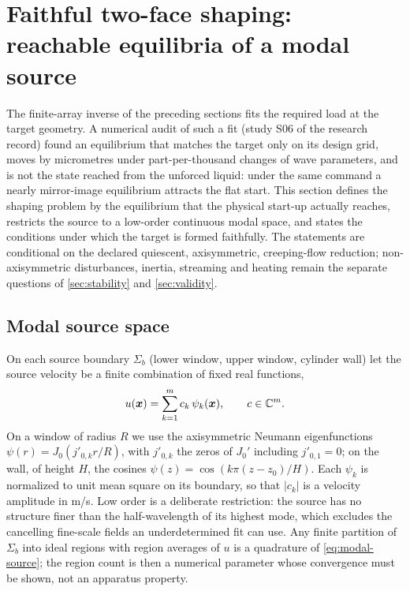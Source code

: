 \section{Faithful two-face shaping: reachable equilibria of a modal source}\label{sec:faithful}

The finite-array inverse of the preceding sections fits the required load at
the target geometry. A numerical audit of such a fit (study S06 of the
research record) found an equilibrium that matches the target only on its
design grid, moves by micrometres under part-per-thousand changes of wave
parameters, and is not the state reached from the unforced liquid: under the
same command a nearly mirror-image equilibrium attracts the flat start. This
section defines the shaping problem by the equilibrium that the physical
start-up actually reaches, restricts the source to a low-order continuous
modal space, and states the conditions under which the target is formed
faithfully. The statements are conditional on the declared quiescent,
axisymmetric, creeping-flow reduction; non-axisymmetric disturbances, inertia,
streaming and heating remain the separate questions of \cref{sec:stability}
and \cref{sec:validity}.

\subsection{Modal source space}
On each source boundary $\Sigma_b$ (lower window, upper window, cylinder wall)
let the source velocity be a finite combination of fixed real functions,
\begin{equation}
 u(\bm x)=\sum_{k=1}^{m}c_k\,\psi_k(\bm x),\qquad c\in\mathbb C^m .
 \label{eq:modal-source}
\end{equation}
On a window of radius $R$ we use the axisymmetric Neumann eigenfunctions
$\psi(r)=J_0(j'_{0,k}r/R)$, with $j'_{0,k}$ the zeros of $J_0'$ including
$j'_{0,1}=0$; on the wall, of height $H$, the cosines $\psi(z)=\cos(k\pi(z-z_0)/H)$.
Each $\psi_k$ is normalized to unit mean square on its boundary, so that
$\lvert c_k\rvert$ is a velocity amplitude in m/s. Low order is a deliberate
restriction: the source has no structure finer than the half-wavelength of its
highest mode, which excludes the cancelling fine-scale fields an
underdetermined fit can use. Any finite partition of $\Sigma_b$ into ideal
regions with region averages of $u$ is a quadrature of
\cref{eq:modal-source}; the region count is then a numerical parameter whose
convergence must be shown, not an apparatus property.

